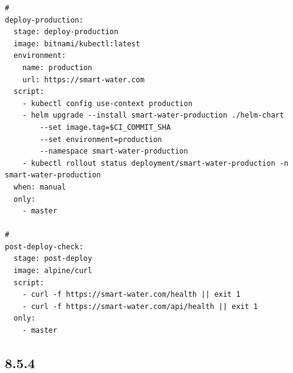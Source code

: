 \begin{lstlisting}
# 
deploy-production:
  stage: deploy-production
  image: bitnami/kubectl:latest
  environment:
    name: production
    url: https://smart-water.com
  script:
    - kubectl config use-context production
    - helm upgrade --install smart-water-production ./helm-chart 
        --set image.tag=$CI_COMMIT_SHA
        --set environment=production
        --namespace smart-water-production
    - kubectl rollout status deployment/smart-water-production -n smart-water-production
  when: manual
  only:
    - master

# 
post-deploy-check:
  stage: post-deploy
  image: alpine/curl
  script:
    - curl -f https://smart-water.com/health || exit 1
    - curl -f https://smart-water.com/api/health || exit 1
  only:
    - master
\end{lstlisting}

\hypertarget{section-127}{%
\subsection{8.5.4}\label{section-127}}

\hypertarget{section-128}{%
\subsubsection{}\label{section-128}}

